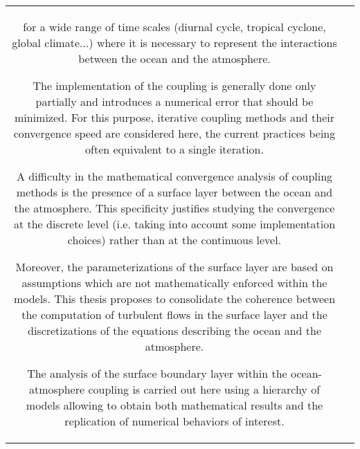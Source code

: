 \begin{tabular}{c|c}
{\begin{minipage}{18em}
for a wide range of time scales
(diurnal cycle, tropical cyclone, global climate...)
where it is necessary to represent the interactions
between the ocean and the atmosphere.
\par
	\vspace{0.2cm}
The implementation of the coupling is generally done only partially
and introduces a numerical error that should be minimized.
For this purpose, iterative coupling methods and their convergence speed
are considered here, the current practices being often equivalent to a
single iteration.
\par
	\vspace{0.2cm}
A difficulty in the mathematical convergence analysis
of coupling methods is the presence of a surface layer
between the ocean and the atmosphere.
This specificity justifies studying the convergence at the
discrete level (i.e. taking into account some implementation choices) rather than
at the continuous level.
\par
	\vspace{0.2cm}
Moreover, the parameterizations of the surface layer
are based on assumptions which are not mathematically
enforced within the models.
This thesis proposes to consolidate the coherence between
the computation of turbulent flows in the surface layer
and the discretizations of the equations describing the ocean
and the atmosphere.
\par
	\vspace{0.2cm}
The analysis of the surface boundary layer within the ocean-atmosphere coupling
is carried out here using a hierarchy
of models allowing to obtain both mathematical results and the
replication of numerical behaviors of interest.
\end{minipage}}
\end{tabular}
